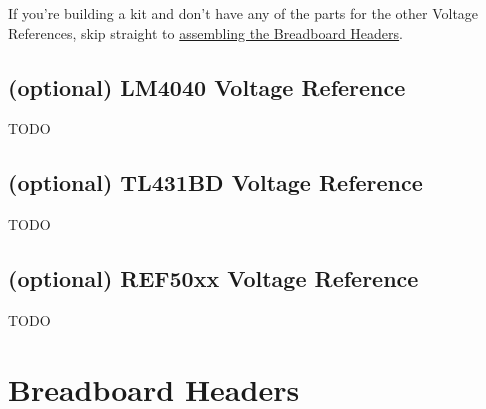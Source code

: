 \documentclass[12pt, a4paper]{article}
\begin{document}
If you're building a kit and don't have any of the parts for the other Voltage References,
skip straight to \hyperref[sec:breadboard_headers]{assembling the Breadboard Headers}.

\subsection{\footnotesize (optional) \normalsize LM4040 Voltage Reference}

TODO

\subsection{\footnotesize (optional) \normalsize TL431BD Voltage Reference}

TODO

\subsection{\footnotesize (optional) \normalsize REF50xx Voltage Reference}

TODO

\pagebreak
\section{Breadboard Headers}
\label{sec:breadboard_headers}
\end{document}
